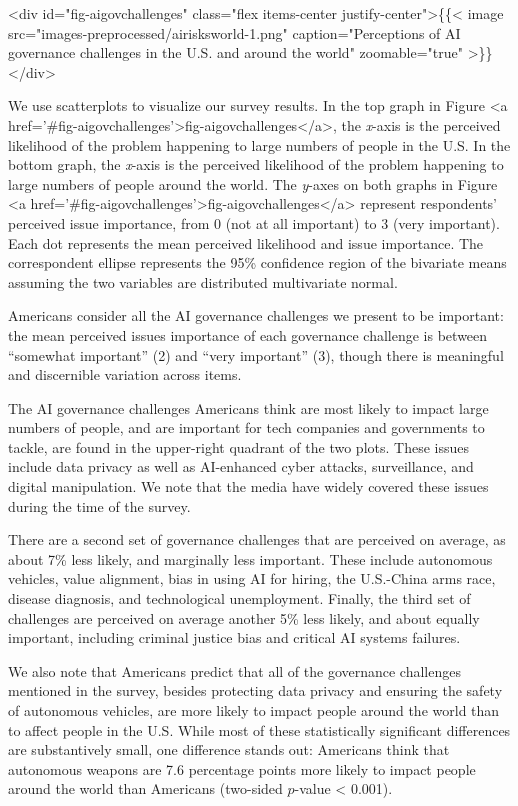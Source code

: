 \documentclass{article}
\begin{document}
<div id="fig-aigovchallenges" class="flex items-center justify-center">\{\{< image src="images-preprocessed/airisksworld-1.png" caption="Perceptions of AI governance challenges in the U.S. and around the world" zoomable="true" >\}\}</div>



We use scatterplots to visualize our survey results. In the top graph in Figure <a href='#fig-aigovchallenges'>fig-aigovchallenges</a>, the \emph{x}-axis is the perceived likelihood of the problem happening to large numbers of people in the U.S. In the bottom graph, the \emph{x}-axis is the perceived likelihood of the problem happening to large numbers of people around the world. The \emph{y}-axes on both graphs in Figure <a href='#fig-aigovchallenges'>fig-aigovchallenges</a> represent respondents' perceived issue importance, from 0 (not at all important) to 3 (very important). Each dot represents the mean perceived likelihood and issue importance. The correspondent ellipse represents the 95\% confidence region of the bivariate means assuming the two variables are distributed multivariate normal.

Americans consider all the AI governance challenges we present to be important: the mean perceived issues importance of each governance challenge is between ``somewhat important'' (2) and ``very important'' (3), though there is meaningful and discernible variation across items.

The AI governance challenges Americans think are most likely to impact large numbers of people, and are important for tech companies and governments to tackle, are found in the upper-right quadrant of the two plots. These issues include data privacy as well as AI-enhanced cyber attacks, surveillance, and digital manipulation. We note that the media have widely covered these issues during the time of the survey.

There are a second set of governance challenges that are perceived on average, as about 7\% less likely, and marginally less important. These include autonomous vehicles, value alignment, bias in using AI for hiring, the U.S.-China arms race, disease diagnosis, and technological unemployment. Finally, the third set of challenges are perceived on average another 5\% less likely, and about equally important, including criminal justice bias and critical AI systems failures.

We also note that Americans predict that all of the governance challenges mentioned in the survey, besides protecting data privacy and ensuring the safety of autonomous vehicles, are more likely to impact people around the world than to affect people in the U.S. While most of these statistically significant differences are substantively small, one difference stands out: Americans think that autonomous weapons are 7.6 percentage points more likely to impact people around the world than Americans (two-sided \(p\)-value \textless{} 0.001).
\end{document}
